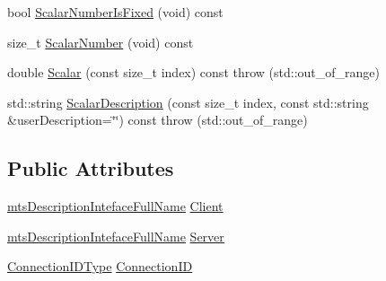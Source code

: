 \begin{DoxyCompactItemize}
\item 
bool \hyperlink{classmts_description_connection_aa8423d48da8b8cb42cd8e1e41cf0bbb6}{Scalar\-Number\-Is\-Fixed} (void) const 
\item 
size\-\_\-t \hyperlink{classmts_description_connection_ae02ed369e99f50b576731ca12b4f1253}{Scalar\-Number} (void) const 
\item 
double \hyperlink{classmts_description_connection_ac0dc917c7de0858bb16452a80ff1e3f3}{Scalar} (const size\-\_\-t index) const   throw (std\-::out\-\_\-of\-\_\-range)
\item 
std\-::string \hyperlink{classmts_description_connection_a2c190e140c86d65f5d70bb80861585a9}{Scalar\-Description} (const size\-\_\-t index, const std\-::string \&user\-Description=\char`\"{}\char`\"{}) const   throw (std\-::out\-\_\-of\-\_\-range)
\end{DoxyCompactItemize}
\subsection*{Public Attributes}
\begin{DoxyCompactItemize}
\item 
\hyperlink{classmts_description_inteface_full_name}{mts\-Description\-Inteface\-Full\-Name} \hyperlink{classmts_description_connection_af112dac883a91f0361c6f01bc3cd33d5}{Client}
\item 
\hyperlink{classmts_description_inteface_full_name}{mts\-Description\-Inteface\-Full\-Name} \hyperlink{classmts_description_connection_a7b9d1dbdb53304b7e999fbf7877179b7}{Server}
\item 
\hyperlink{mts_forward_declarations_8h_ad3543bb11742e1766374ec96016d6547}{Connection\-I\-D\-Type} \hyperlink{classmts_description_connection_a1de49cbdcc537cae81975772fff86798}{Connection\-I\-D}
\end{DoxyCompactItemize}


